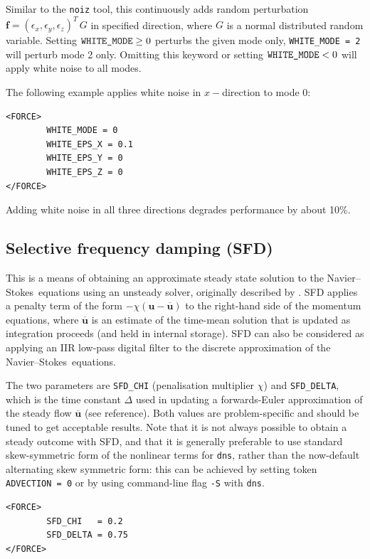 \documentclass[11pt]{report}
\newcommand\NavSto{Navier--Stokes}
\begin{document}
Similar to the \verb+noiz+ tool, this continuously adds random
perturbation $\bm{f} = (\epsilon_x, \epsilon_y, \epsilon_z)^T\,G$ in
specified direction, where $G$ is a normal distributed random
variable. Setting $\verb+WHITE_MODE+ \ge 0$ perturbs the given mode
only, \ie \verb+WHITE_MODE = 2+ will perturb mode 2 only. Omitting
this keyword or setting $\verb+WHITE_MODE+ < 0$ will apply white noise
to all modes.

The following example applies white noise in $x-$direction to mode 0:
\begin{verbatim}
<FORCE>
        WHITE_MODE = 0
        WHITE_EPS_X = 0.1
        WHITE_EPS_Y = 0
        WHITE_EPS_Z = 0
</FORCE>
\end{verbatim}
Adding white noise in all three directions degrades performance by
about 10\%. 

\subsection{Selective frequency damping (SFD)}
\label{sec.sfd}

This is a means of obtaining an approximate steady state solution to
the \NavSto\ equations using an unsteady solver, originally described
by \citet{abhhms06}. SFD applies a penalty term of the form
$-\chi(\bm{u}-\overline{\bm{u}})$ to the right-hand side of the
momentum equations, where $\overline{\bm{u}}$ is an estimate of the
time-mean solution that is updated as integration proceeds (and held
in internal storage). SFD can also be considered as applying an IIR
low-pass digital filter to the discrete approximation of the
\NavSto\ equations.

The two parameters are \verb|SFD_CHI| (\ie penalisation multiplier
$\chi$) and \verb|SFD_DELTA|, which is the time constant $\Delta$ used
in updating a forwards-Euler approximation of the steady flow
$\overline{\bm{u}}$ (see reference).  Both values are problem-specific
and should be tuned to get acceptable results.  Note that it is not
always possible to obtain a steady outcome with SFD, and that it is
generally preferable to use standard skew-symmetric form of the
nonlinear terms for \verb|dns|, rather than the now-default
alternating skew symmetric form: this can be achieved by setting token
\verb|ADVECTION = 0| or by using command-line flag \verb|-S| with
\verb|dns|.

\begin{verbatim}
<FORCE>
        SFD_CHI   = 0.2
        SFD_DELTA = 0.75
</FORCE>
\end{verbatim}
\end{document}
